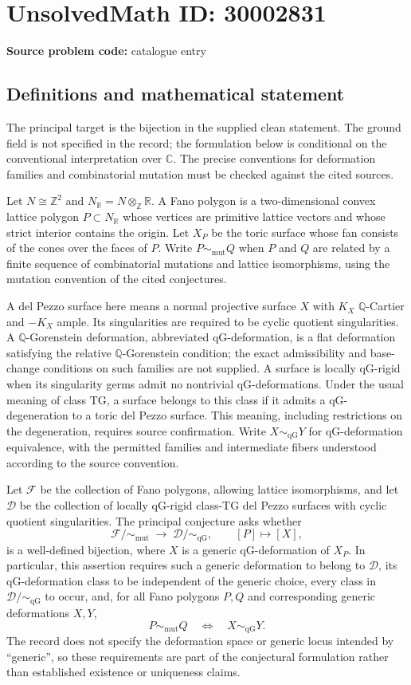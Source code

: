 \documentclass[11pt]{article}
\newcommand{\Z}{\mathbb{Z}}
\newcommand{\Q}{\mathbb{Q}}
\newcommand{\R}{\mathbb{R}}
\newcommand{\C}{\mathbb{C}}
\begin{document}
\section*{UnsolvedMath ID: 30002831}
\textbf{Source problem code:} catalogue entry
\subsection{Definitions and mathematical statement}
The principal target is the bijection in the supplied clean statement. The ground field is not specified in the record; the formulation below is conditional on the conventional interpretation over \(\C\). The precise conventions for deformation families and combinatorial mutation must be checked against the cited sources.

Let \(N\cong\Z^2\) and \(N_{\R}=N\otimes_{\Z}\R\). A Fano polygon is a two-dimensional convex lattice polygon \(P\subset N_{\R}\) whose vertices are primitive lattice vectors and whose strict interior contains the origin. Let \(X_P\) be the toric surface whose fan consists of the cones over the faces of \(P\). Write \(P\sim_{\mathrm{mut}}Q\) when \(P\) and \(Q\) are related by a finite sequence of combinatorial mutations and lattice isomorphisms, using the mutation convention of the cited conjectures.

A del Pezzo surface here means a normal projective surface \(X\) with \(K_X\) \(\Q\)-Cartier and \(-K_X\) ample. Its singularities are required to be cyclic quotient singularities. A \(\Q\)-Gorenstein deformation, abbreviated qG-deformation, is a flat deformation satisfying the relative \(\Q\)-Gorenstein condition; the exact admissibility and base-change conditions on such families are not supplied. A surface is locally qG-rigid when its singularity germs admit no nontrivial qG-deformations. Under the usual meaning of class \(\mathrm{TG}\), a surface belongs to this class if it admits a qG-degeneration to a toric del Pezzo surface. This meaning, including restrictions on the degeneration, requires source confirmation. Write \(X\sim_{\mathrm{qG}}Y\) for qG-deformation equivalence, with the permitted families and intermediate fibers understood according to the source convention.

Let \(\mathcal F\) be the collection of Fano polygons, allowing lattice isomorphisms, and let \(\mathcal D\) be the collection of locally qG-rigid class-\(\mathrm{TG}\) del Pezzo surfaces with cyclic quotient singularities. The principal conjecture asks whether
\[
\mathcal F/\!\sim_{\mathrm{mut}}
\;\longrightarrow\;
\mathcal D/\!\sim_{\mathrm{qG}},
\qquad
[P]\longmapsto[X],
\]
is a well-defined bijection, where \(X\) is a generic qG-deformation of \(X_P\). In particular, this assertion requires such a generic deformation to belong to \(\mathcal D\), its qG-deformation class to be independent of the generic choice, every class in \(\mathcal D/\!\sim_{\mathrm{qG}}\) to occur, and, for all Fano polygons \(P,Q\) and corresponding generic deformations \(X,Y\),
\[
P\sim_{\mathrm{mut}}Q
\quad\Longleftrightarrow\quad
X\sim_{\mathrm{qG}}Y.
\]
The record does not specify the deformation space or generic locus intended by ``generic'', so these requirements are part of the conjectural formulation rather than established existence or uniqueness claims.
\end{document}
